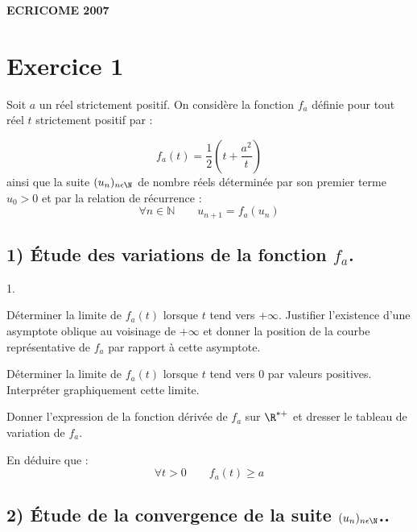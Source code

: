 \documentclass[11pt]{article}%
\begin{document}
\begin{center}
\textbf{ECRICOME 2007}
\end{center}

\section*{Exercice 1}

Soit $a$ un réel strictement positif. On considère la fonction $f_{a}
$ définie pour tout réel $t$ strictement positif par :

\[
f_{a}(t) = \dfrac 12(t + \dfrac{a^{2}}t)
\]
ainsi que la suite $(u_{n})_{n\epsilon \N}$ de nombre réels déterminée
par son premier terme $u_{0}>0$ et par la relation de récurrence : 
\[
\forall n\in \mathbb{N\qquad }u_{n + 1} = f_{a}(u_{n})
\]

\subsection*{1) Étude des variations de la fonction $f_{a}$.}

\begin{noliste}{1.}
 \setlength{\itemsep}{4mm}
\item Déterminer la limite de $f_{a}(t)$ lorsque $t$ tend vers $ +
\infty $.
Justifier l'existence d'une asymptote oblique au voisinage de $ +
\infty $ et
donner la position de la courbe représentative de $f_{a}$ par rapport à
cette asymptote.

\item Déterminer la limite de $f_{a}(t)$ lorsque $t$ tend vers $0$ par
valeurs positives. Interpréter graphiquement cette limite.

\item Donner l'expression de la fonction dérivée de $f_{a}$ sur $\R^{*
+}$ et dresser le tableau de variation de $f_{a}$.

\item En déduire que : 
\[
\forall t>0\qquad f_{a}(t)\geq a
\]
\end{noliste}

\subsection*{2) Étude de la convergence de la suite $(u_{n})_{n\protect
\epsilon 
\N}$..}
\end{document}
